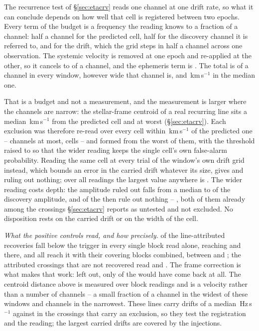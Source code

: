 The recurrence test of \S\ref{sec:etacrv} reads one channel at one drift
rate, so what it can conclude depends on how well that cell is registered
between two epochs. Every term of the budget is a frequency the reading
knows to a fraction of a channel: half a channel for the predicted cell,
half for the discovery channel it is referred to, and \RgDriftWithinChMed{}
for the drift, which the grid steps in half a channel across one
observation. The systemic velocity is removed at one epoch and re-applied at
the other, so it cancels to \RgVsysChMax{} of a channel, and the ephemeris
term is \RgBaryChMax. The total is \RgBudgetChMed{} of a channel in every
window, however wide that channel is, and \RgBudgetKmsMed\,km\,s$^{-1}$ in
the median one.

That is a budget and not a measurement, and the measurement is larger where
the channels are narrow: the stellar-frame centroid of a real recurring line
sits a median \RgCenMedKms\,km\,s$^{-1}$ from the predicted cell and
\RgCenMaxKms{} at worst (\S\ref{sec:etacrv}). Each exclusion was
therefore re-read over every cell within \RgTolKms\,km\,s$^{-1}$ of the
predicted one -- \RgTolChMax{} channels at most, \RgNTrialMax{} cells -- and
formed from the worst of them, with the threshold raised to \RgThrMax{} so
that the wider reading keeps the single cell's own false-alarm probability.
Reading the same cell at every trial of the window's own drift grid instead,
which bounds an error in the carried drift whatever its size, gives
\ZtFracWideMed{} and \ZtNWideVac{} ruling out nothing; over all
\RcNRepeatMeas{} readings the largest value anywhere is \RcTMax.
The wider reading costs depth: the amplitude ruled out falls from a
median \RcFracMed{} to \RgFracMed{} of the discovery amplitude, and
\RgNVac{} of the \RcNExcl{} then rule out nothing -- \RgVacList, both of them
already among the \HjNPowerLo{} crossings \S\ref{sec:etacrv} reports as
untested and not excluded. No disposition rests on the carried drift or
on the width of the cell.

\emph{What the positive controls read, and how precisely.} \RgNCtlBelow{} of
the \RgNCtl{} line-attributed recoveries fall below the trigger in every
single block read alone, reaching \RgCtlLoOne{} and \RgCtlLoTwo{} there, and
all \RgNCtl{} reach it with their covering blocks combined, between
\LrTrepLo{} and \LrTrepHi; the \LrNAbs{} attributed crossings that are not
recovered read \LrAbsHi{} and \LrAbsLo. The frame correction is what makes
that work: left out, only \LrNoFrameCtl{} of the \LrNCtl{} would have come
back at all. The centroid distance above is measured over \RgCenNBlock{}
block readings and is a velocity rather than a number of channels -- a small
fraction of a channel in the widest of these windows and \RgOffMaxCh{}
channels in the narrowest. These lines carry drifts of a median
\LrDriftMedLine\,Hz\,s$^{-1}$ against \LrDriftMedExcl{} in the crossings that
carry an exclusion, so they test the registration and the reading; the largest carried drifts are covered by the injections.

